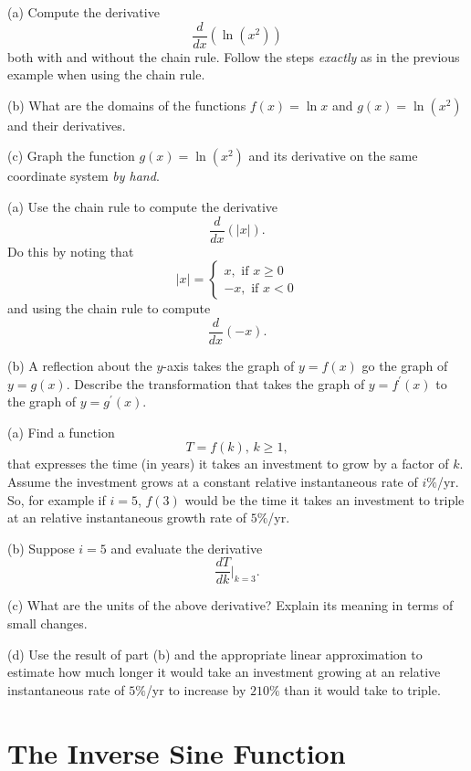 \documentclass{ximera}
\begin{document}
\begin{question}  \label{Qdfbb44443243}
(a) Compute the derivative 
\[
       \frac{d}{dx} \left( \ln(x^2)  \right)
\]
both with and without the chain rule. Follow the steps \emph{exactly} as in the previous example when using the chain rule.

(b) What are the domains of the functions $f(x)=\ln x$ and $g(x) = \ln (x^2)$ and their derivatives.

(c) Graph the function $g(x) = \ln (x^2)$ and its derivative on the same coordinate system \emph{by hand}.

\end{question}

\begin{question}  \label{Qdefrgbhrdtgr}
(a) Use the chain rule to compute the derivative
\[
   \frac{d}{dx} \left(  |x| \right) .
\]
Do this by noting that
\[
|x| = 
\begin{cases}
    x , \text{ if } x\geq 0 \\
   -x ,  \text{ if } x<0
\end{cases}
\]
and using the chain rule to compute 
\[
  \frac{d}{dx}  \left(  -x \right).
\]

(b) A reflection about the $y$-axis takes the graph of $y=f(x)$ go the graph of $y=g(x)$. Describe the transformation that takes the graph of $y=f^\prime(x)$ to the graph of $y=g^\prime(x)$.

\end{question}

\begin{question} \label{Qmf4566544}
(a) Find a function
\[
      T = f(k) , \, k\geq 1,
\]
that expresses the time (in years) it takes an investment to grow by a factor of $k$. Assume the investment grows at a constant relative instantaneous rate of $i\%$/yr. So, for example if $i=5$, $f(3)$ would be the time it takes an investment to triple at an relative instantaneous growth rate of $5\%$/yr.

(b) Suppose $i=5$ and evaluate the derivative
\[
    \frac{dT}{dk} \Big|_{k=3} .
\]

(c) What are the units of the above derivative? Explain its meaning in terms of small changes.

(d) Use the result of part (b) and the appropriate linear approximation to estimate how much longer it would take an investment growing at an relative instantaneous rate of $5\%$/yr to increase by $210\%$ than it would take to triple.
\end{question}


\section*{The Inverse Sine Function}
\end{document}
